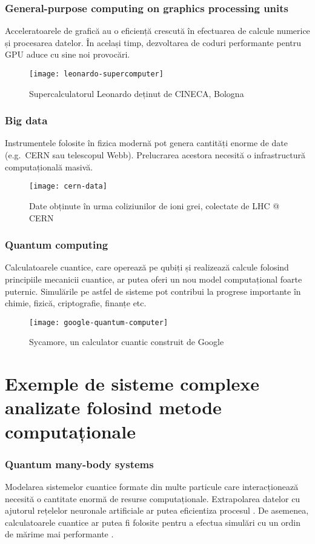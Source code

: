 \begin{frame}
\frametitle{General-purpose computing on graphics processing units}

Acceleratoarele de grafică au o eficiență crescută în efectuarea de calcule numerice și procesarea datelor. În același timp, dezvoltarea de coduri performante pentru GPU aduce cu sine noi provocări.

\begin{figure}
    \centering
    \texttt{[image: leonardo-supercomputer]}
    \caption*{\footnotesize Supercalculatorul Leonardo deținut de CINECA, Bologna}
\end{figure}
\end{frame}

\begin{frame}
\frametitle{Big data}

Instrumentele folosite în fizica modernă pot genera cantități enorme de date (e.g.~CERN sau telescopul Webb). Prelucrarea acestora necesită o infrastructură computațională masivă.

\begin{figure}
    \centering
    \texttt{[image: cern-data]}
    \caption*{\footnotesize Date obținute în urma coliziunilor de ioni grei, colectate de LHC @ CERN}
\end{figure}
\end{frame}

\begin{frame}
\frametitle{Quantum computing}

Calculatoarele cuantice, care operează pe qubiți și realizează calcule folosind principiile mecanicii cuantice, ar putea oferi un nou model computațional foarte puternic. Simulările pe astfel de sisteme pot contribui la progrese importante în chimie, fizică, criptografie, finanțe etc.

\begin{figure}
    \centering
    \texttt{[image: google-quantum-computer]}
    \caption*{\footnotesize Sycamore, un calculator cuantic construit de Google}
\end{figure}
\end{frame}

\section{Exemple de sisteme complexe analizate folosind metode computaționale}

\begin{frame}
\frametitle{Quantum many-body systems}

Modelarea sistemelor cuantice formate din multe particule care interacționează necesită o cantitate enormă de resurse computaționale. Extrapolarea datelor cu ajutorul rețelelor neuronale artificiale ar putea eficientiza procesul \autocite{PantisSimut2023}. De asemenea, calculatoarele cuantice ar putea fi folosite pentru a efectua simulări cu un ordin de mărime mai performante \autocite{Dumitrescu2018}.
\end{frame}

